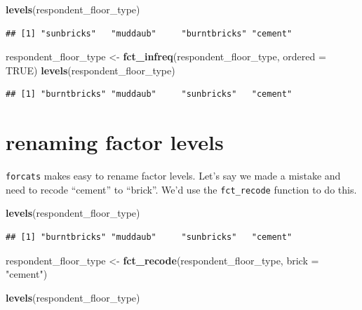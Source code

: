 \documentclass[]{book}
\newenvironment{Shaded}{\begin{snugshade}}{\end{snugshade}}
\newcommand{\KeywordTok}[1]{\textcolor[rgb]{0.13,0.29,0.53}{\textbf{#1}}}
\newcommand{\DataTypeTok}[1]{\textcolor[rgb]{0.13,0.29,0.53}{#1}}
\newcommand{\StringTok}[1]{\textcolor[rgb]{0.31,0.60,0.02}{#1}}
\newcommand{\OtherTok}[1]{\textcolor[rgb]{0.56,0.35,0.01}{#1}}
\newcommand{\NormalTok}[1]{#1}
\begin{document}
\begin{Shaded}
\begin{Highlighting}[]
\KeywordTok{levels}\NormalTok{(respondent_floor_type)}
\end{Highlighting}
\end{Shaded}

\begin{verbatim}
## [1] "sunbricks"   "muddaub"     "burntbricks" "cement"
\end{verbatim}

\begin{Shaded}
\begin{Highlighting}[]
\NormalTok{respondent_floor_type <-}\StringTok{ }\KeywordTok{fct_infreq}\NormalTok{(respondent_floor_type, }\DataTypeTok{ordered =} \OtherTok{TRUE}\NormalTok{)}
\KeywordTok{levels}\NormalTok{(respondent_floor_type)}
\end{Highlighting}
\end{Shaded}

\begin{verbatim}
## [1] "burntbricks" "muddaub"     "sunbricks"   "cement"
\end{verbatim}

\section{renaming factor levels}\label{renaming-factor-levels}

\texttt{forcats} makes easy to rename factor levels. Let's say we made a
mistake and need to recode ``cement'' to ``brick''. We'd use the
\texttt{fct\_recode} function to do this.

\begin{Shaded}
\begin{Highlighting}[]
\KeywordTok{levels}\NormalTok{(respondent_floor_type)}
\end{Highlighting}
\end{Shaded}

\begin{verbatim}
## [1] "burntbricks" "muddaub"     "sunbricks"   "cement"
\end{verbatim}

\begin{Shaded}
\begin{Highlighting}[]
\NormalTok{respondent_floor_type <-}\StringTok{ }\KeywordTok{fct_recode}\NormalTok{(respondent_floor_type, }\DataTypeTok{brick =} \StringTok{"cement"}\NormalTok{)}

\KeywordTok{levels}\NormalTok{(respondent_floor_type)}
\end{Highlighting}
\end{Shaded}
\end{document}
